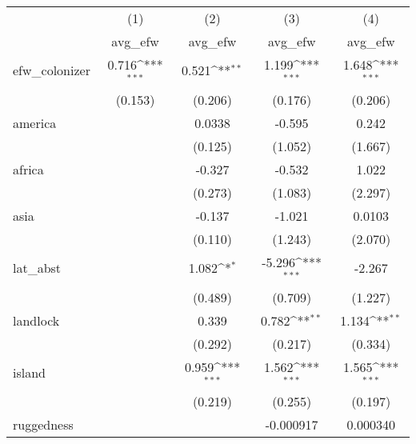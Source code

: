 {
\def\sym#1{\ifmmode^{#1}\else\(^{#1}\)\fi}
\begin{tabular}{l*{4}{c}}
\hline\hline
            &\multicolumn{1}{c}{(1)}&\multicolumn{1}{c}{(2)}&\multicolumn{1}{c}{(3)}&\multicolumn{1}{c}{(4)}\\
            &\multicolumn{1}{c}{avg\_efw}&\multicolumn{1}{c}{avg\_efw}&\multicolumn{1}{c}{avg\_efw}&\multicolumn{1}{c}{avg\_efw}\\
\hline
efw\_colonizer&       0.716\sym{***}&       0.521\sym{**} &       1.199\sym{***}&       1.648\sym{***}\\
            &     (0.153)         &     (0.206)         &     (0.176)         &     (0.206)         \\
[1em]
america     &                     &      0.0338         &      -0.595         &       0.242         \\
            &                     &     (0.125)         &     (1.052)         &     (1.667)         \\
[1em]
africa      &                     &      -0.327         &      -0.532         &       1.022         \\
            &                     &     (0.273)         &     (1.083)         &     (2.297)         \\
[1em]
asia        &                     &      -0.137         &      -1.021         &      0.0103         \\
            &                     &     (0.110)         &     (1.243)         &     (2.070)         \\
[1em]
lat\_abst    &                     &       1.082\sym{*}  &      -5.296\sym{***}&      -2.267         \\
            &                     &     (0.489)         &     (0.709)         &     (1.227)         \\
[1em]
landlock    &                     &       0.339         &       0.782\sym{**} &       1.134\sym{**} \\
            &                     &     (0.292)         &     (0.217)         &     (0.334)         \\
[1em]
island      &                     &       0.959\sym{***}&       1.562\sym{***}&       1.565\sym{***}\\
            &                     &     (0.219)         &     (0.255)         &     (0.197)         \\
[1em]
ruggedness  &                     &                     &   -0.000917         &    0.000340         \\

\end{tabular}}
